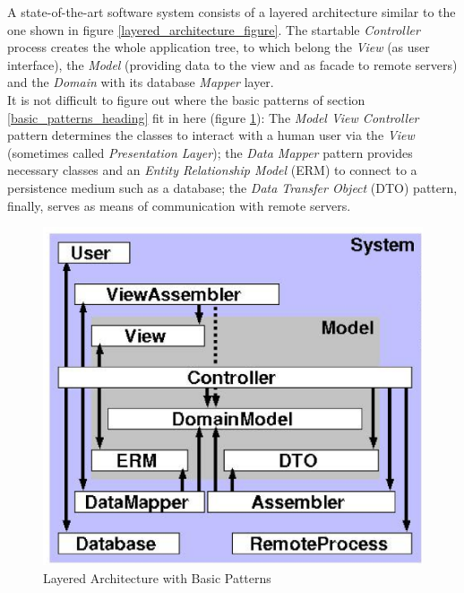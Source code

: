 A state-of-the-art software system consists of a layered architecture similar to the
one shown in figure \ref{layered_architecture_figure}. The startable \emph{Controller}
process creates the whole application tree, to which belong the \emph{View} (as
user interface), the \emph{Model} (providing data to the view and as facade to
remote servers) and the \emph{Domain} with its database \emph{Mapper} layer.\\
It is not difficult to figure out where the basic patterns of section \ref{basic_patterns_heading}
fit in here (figure \ref{layered_architecture_with_basic_patterns_figure}):
The \emph{Model View Controller} pattern determines the classes to interact with
a human user via the \emph{View} (sometimes called \emph{Presentation Layer});
the \emph{Data Mapper} pattern provides necessary classes and an \emph{Entity
Relationship Model} (ERM) to connect to a persistence medium such as a database;
the \emph{Data Transfer Object} (DTO) pattern, finally, serves as means of
communication with remote servers.

\begin{figure}[ht]
    \begin{center}
        \includegraphics[scale=0.3]{vector/layered_architecture_with_basic_patterns.eps}
        \caption{Layered Architecture with Basic Patterns}
        \label{layered_architecture_with_basic_patterns_figure}
    \end{center}
\end{figure}

